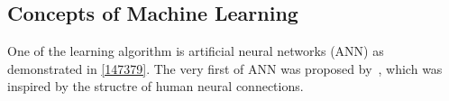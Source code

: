 \subsection{Concepts of Machine Learning}
One of the learning algorithm is artificial neural networks (ANN) as demonstrated in \ref{147379}. The very first of ANN was proposed by~\citet{McCulloch_1943}, which was inspired by the structre of human neural connections. 